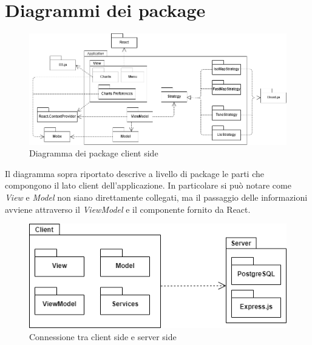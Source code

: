 \section{Diagrammi dei package}
\begin{figure}[hb]
\includegraphics[width=15.8cm]{Images/Allegato Tecnico-Package}
\centering
\caption{Diagramma dei package client side}
\end{figure}

Il diagramma sopra riportato descrive a livello di package le parti che compongono il lato client dell'applicazione. In particolare si può notare come \textit{View} e \textit{Model} non siano direttamente collegati, ma il passaggio delle informazioni avviene attraverso il \textit{ViewModel} e il componente  fornito da React. \\ %

\begin{figure}[hb]
\includegraphics[width=15.8cm]{Images/Allegato Tecnico-Package 2}
\centering
\caption{Connessione tra client side e server side}
\end{figure}

